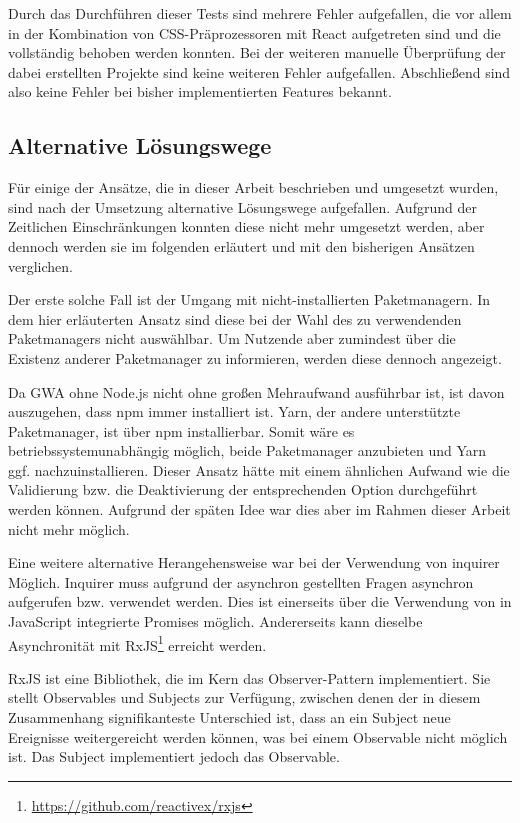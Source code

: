 Durch das Durchführen dieser Tests sind mehrere Fehler aufgefallen, die vor allem in der Kombination von CSS-Präprozessoren mit React aufgetreten sind und die vollständig behoben werden konnten. Bei der weiteren manuelle Überprüfung der dabei erstellten Projekte sind keine weiteren Fehler aufgefallen. Abschließend sind also keine Fehler bei bisher implementierten Features bekannt.

\subsection{Alternative Lösungswege}
Für einige der Ansätze, die in dieser Arbeit beschrieben und umgesetzt wurden, sind nach der Umsetzung alternative Lösungswege aufgefallen. Aufgrund der Zeitlichen Einschränkungen konnten diese nicht mehr umgesetzt werden, aber dennoch werden sie im folgenden erläutert und mit den bisherigen Ansätzen verglichen.

Der erste solche Fall ist der Umgang mit nicht-installierten Paketmanagern. In dem hier erläuterten Ansatz sind diese bei der Wahl des zu verwendenden Paketmanagers nicht auswählbar. Um Nutzende aber zumindest über die Existenz anderer Paketmanager zu informieren, werden diese dennoch angezeigt.

Da \gls{GWA} ohne Node.js nicht ohne großen Mehraufwand ausführbar ist, ist davon auszugehen, dass \gls{npm} immer installiert ist. Yarn, der andere unterstützte Paketmanager, ist über \gls{npm} installierbar. Somit wäre es betriebssystemunabhängig möglich, beide Paketmanager anzubieten und Yarn ggf. nachzuinstallieren. Dieser Ansatz hätte mit einem ähnlichen Aufwand wie die Validierung bzw. die Deaktivierung der entsprechenden Option durchgeführt werden können. Aufgrund der späten Idee war dies aber im Rahmen dieser Arbeit nicht mehr möglich.

Eine weitere alternative Herangehensweise war bei der Verwendung von inquirer Möglich. Inquirer muss aufgrund der asynchron gestellten Fragen asynchron aufgerufen bzw. verwendet werden. Dies ist einerseits über die Verwendung von in JavaScript integrierte Promises möglich. Andererseits kann dieselbe Asynchronität mit RxJS\footnote{\url{https://github.com/reactivex/rxjs}} erreicht werden.

RxJS ist eine Bibliothek, die im Kern das Observer-Pattern implementiert. Sie stellt Observables und Subjects zur Verfügung, zwischen denen der in diesem Zusammenhang signifikanteste Unterschied ist, dass an ein Subject neue Ereignisse weitergereicht werden können, was bei einem Observable nicht möglich ist. Das Subject implementiert jedoch das Observable.

